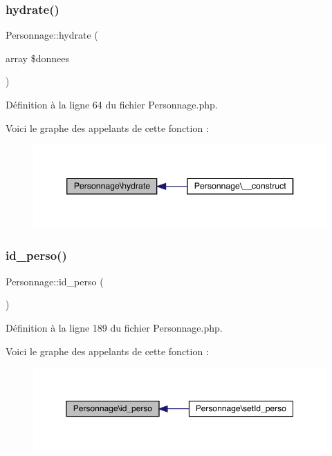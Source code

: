 \subsubsection{\texorpdfstring{hydrate()}{hydrate()}}
{\footnotesize\ttfamily Personnage\+::hydrate (\begin{DoxyParamCaption}\item[{array}]{\$donnees }\end{DoxyParamCaption})}



Définition à la ligne 64 du fichier Personnage.\+php.

Voici le graphe des appelants de cette fonction \+:\nopagebreak
\begin{figure}[H]
\begin{center}
\leavevmode
\includegraphics[width=346pt]{class_personnage_ae95e51cac2f518a6a38d025f5580be3f_icgraph}
\end{center}
\end{figure}
\mbox{\label{class_personnage_aa34eed6a48eb3734596505b58497f2f1}} 
\subsubsection{\texorpdfstring{id\+\_\+perso()}{id\_perso()}}
{\footnotesize\ttfamily Personnage\+::id\+\_\+perso (\begin{DoxyParamCaption}{ }\end{DoxyParamCaption})}



Définition à la ligne 189 du fichier Personnage.\+php.

Voici le graphe des appelants de cette fonction \+:\nopagebreak
\begin{figure}[H]
\begin{center}
\leavevmode
\includegraphics[width=350pt]{class_personnage_aa34eed6a48eb3734596505b58497f2f1_icgraph}
\end{center}
\end{figure}
\mbox{\label{class_personnage_ab0fc8802437d3f7bbc0da720597d0393}} 

